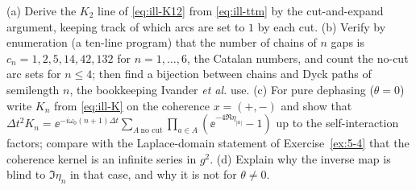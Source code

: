 \begin{exercise}\label{ex:7-5}
(a) Derive the $K_2$ line of \cref{eq:ill-K12} from \cref{eq:ill-ttm} by the cut-and-expand argument, keeping track of which arcs are set to $1$ by each cut.
(b) Verify by enumeration (a ten-line program) that the number of chains of $n$ gaps is $c_n=1,2,5,14,42,132$ for $n=1,\dots,6$, the Catalan numbers, and count the no-cut arc sets for $n\le4$; then find a bijection between chains and Dyck paths of semilength $n$, the bookkeeping Ivander \emph{et al.} use.
(c) For pure dephasing ($\theta=0$) write $K_n$ from \cref{eq:ill-K} on the coherence $x=(+,-)$ and show that $\Delta t^2K_n=\ee^{-i\omega_0(n+1)\Delta t}\sum_{A\ \text{no cut}}\prod_{a\in A}(\ee^{-4\Re\eta_{|a|}}-1)$ up to the self-interaction factors; compare with the Laplace-domain statement of Exercise~\ref{ex:5-4} that the coherence kernel is an infinite series in $g^2$.
(d) Explain why the inverse map is blind to $\Im\eta_n$ in that case, and why it is not for $\theta\ne0$.
\end{exercise}

\clearpage
